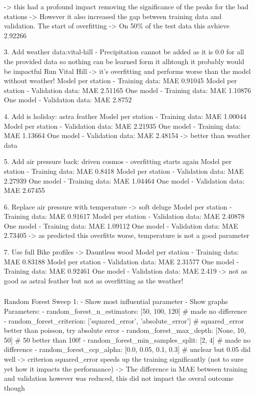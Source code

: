 \documentclass[a4paper]{article}
\begin{document}
    -> this had a profound impact removing the significance of the peaks for the bad stations
    -> However it also increased the gap between training data and validation. The start of overfitting
    -> On 50\% of the test data this avhieve 2.92266

    3. Add weather data:vital-hill
    - Precipitation cannot be added as it is 0.0 for all the provided data so nothing can be learned form it
    alhtough it probably would be impactful
    Run Vital Hill -> it's overfitting and performs worse than the model without weather!
    Model per station - Training data: MAE 0.91045
    Model per station - Validation data: MAE 2.51165
    One model - Training data: MAE 1.10876
    One model - Validation data: MAE 2.8752

    4. Add is holiday: astra feather
    Model per station - Training data: MAE 1.00044
    Model per station - Validation data: MAE 2.21935
    One model - Training data: MAE 1.13664
    One model - Validation data: MAE 2.48154
    -> better than weather data

    5. Add air pressure back: driven cosmos - overfitting starts again
    Model per station - Training data: MAE 0.8418
    Model per station - Validation data: MAE 2.27939
    One model - Training data: MAE 1.04464
    One model - Validation data: MAE 2.67455


    6. Replace air pressure with temperature -> soft deluge
    Model per station - Training data: MAE 0.91617
    Model per station - Validation data: MAE 2.40878
    One model - Training data: MAE 1.09112
    One model - Validation data: MAE 2.73405
    -> as predicted this overfitts worse, temperature is not a good parameter

    7. Use full Bike profiles -> Dauntless wood
    Model per station - Training data: MAE 0.83188
    Model per station - Validation data: MAE 2.31577
    One model - Training data: MAE 0.92461
    One model - Validation data: MAE 2.419
    -> not as good as astral feather but not as overfitting as the weather!


    \subsubsection*{}

    Random Forest Sweep 1:
    - Show most influential parameter
    - Show graphs
    Parameters:
    - random\_forest\_n\_estimators:  [50, 100, 120] # made no difference
    - random\_forest\_criterion: ['squared\_error', 'absolute\_error']  # squared\_error better than poisson, try absolute error
    - random\_forest\_max\_depth: [None, 10, 50]  # 50 better than 100!
    - random\_forest\_min\_samples\_split: [2, 4] # made no difference
    - random\_forest\_ccp\_alpha: [0.0, 0.05, 0.1, 0.3]  # unclear but 0.05 did well
    -> criterion squared\_error speeds up the training significantly (not to sure yet how it impacts the performance)
    -> The difference in MAE between training and validation however was reduced, this did not impact the overal outcome though
\end{document}
